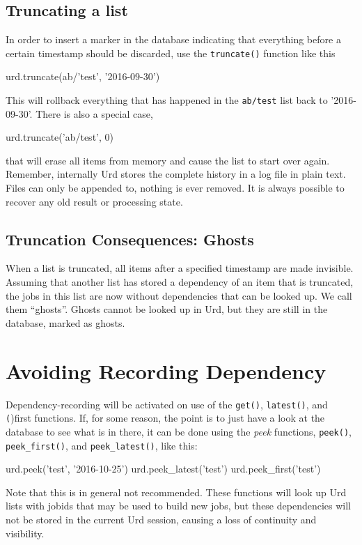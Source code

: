 \subsection{Truncating a list}
In order to insert a marker in the database indicating that everything
before a certain timestamp should be discarded, use
the \texttt{truncate()} function like this
\begin{python}
urd.truncate(ab/'test', '2016-09-30')
\end{python}
This will rollback everything that has happened in
the \texttt{ab/test} list back to '2016-09-30'.  There is also a
special case,
\begin{python}
urd.truncate('ab/test', 0)
\end{python}
that will erase all items from memory and cause the list to start over
again.  Remember, internally Urd stores the complete history in a log
file in plain text.  Files can only be appended to, nothing is ever
removed.  It is always possible to recover any old result or
processing state.



\subsection{Truncation Consequences:  Ghosts}
When a list is truncated, all items after a specified timestamp are
made invisible.  Assuming that another list has stored a dependency of
an item that is truncated, the jobs in this list are now without
dependencies that can be looked up.  We call them ``ghosts''.  Ghosts
cannot be looked up in Urd, but they are still in the database, marked
as ghosts.






\section{Avoiding Recording Dependency}
Dependency-recording will be activated on use of the \texttt{get()},
\texttt{latest()}, and \texttt(){first} functions.  If, for some reason,
the point is to just have a look at the database to see what is in
there, it can be done using the \textsl{peek}
functions, \texttt{peek()}, \texttt{peek\_first()}, and
\texttt{peek\_latest()}, like this:
\begin{python}
urd.peek('test', '2016-10-25')
urd.peek_latest('test')
urd.peek_first('test')
\end{python}
Note that this is in general not recommended.  These functions will
look up Urd lists with jobids that may be used to build new jobs, but
these dependencies will not be stored in the current Urd session,
causing a loss of continuity and visibility.



